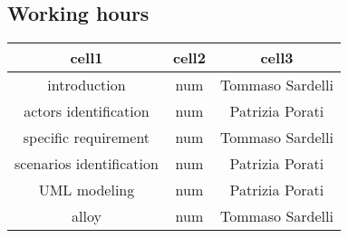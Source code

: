\subsection{Working hours}

\begin{center}
	\begin{tabular}{ c c c } 
		\hline
		cell1 & cell2 & cell3 \\ 
		\hline
		introduction				& num	& Tommaso Sardelli	\\
		actors identification		& num	& Patrizia Porati 	\\
		specific requirement 		& num 	& Tommaso Sardelli 	\\ 
		scenarios identification	& num 	& Patrizia Porati	\\
		UML modeling				& num	& Patrizia Porati	\\
		alloy						& num	& Tommaso Sardelli 	\\
		\hline
	\end{tabular}
\end{center}